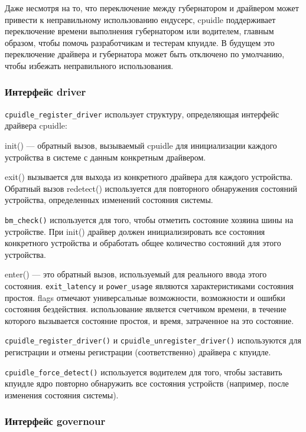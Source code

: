 \documentclass{article}
\begin{document}
Даже несмотря на то, что переключение между губернатором и драйвером может привести к неправильному использованию ендусерс, cpuidle поддерживает переключение времени выполнения губернатором или водителем, главным образом, чтобы помочь разработчикам и тестерам кпуидле. В будущем это переключение драйвера и губернатора может быть отключено по умолчанию, чтобы избежать неправильного использования.

\subsubsection{Интерфейс driver}
\texttt{cpuidle\_register\_driver} использует структуру, определяющая интерфейс драйвера cpuidle:

init() — обратный вызов, вызываемый cpuidle для инициализации каждого устройства в системе с данным конкретным драйвером.

exit() вызывается для выхода из конкретного драйвера для каждого устройства. Обратный вызов redetect() используется для повторного обнаружения состояний устройства, определенных изменений состояния системы.

\texttt{bm\_check()} используется для того, чтобы отметить состояние хозяина шины на устройстве. При init() драйвер должен инициализировать все состояния конкретного устройства и обработать общее количество состояний для этого устройства.



enter() — это обратный вызов, используемый для реального ввода этого состояния. \texttt{exit\_latency} и \texttt{power\_usage} являются характеристиками состояния простоя. flags отмечают универсальные возможности, возможности и ошибки состояния бездействия. использование является счетчиком времени, в течение которого вызывается состояние простоя, и время, затраченное на это состояние.

\texttt{cpuidle\_register\_driver()} и \texttt{cpuidle\_unregister\_driver()} используются для регистрации и отмены регистрации (соответственно) драйвера с кпуидле.

\texttt{cpuidle\_force\_detect()} используется водителем для того, чтобы заставить кпуидле ядро повторно обнаружить все состояния устройств (например, после изменения состояния системы).

\subsubsection{Интерфейс governour}

\end{document}
